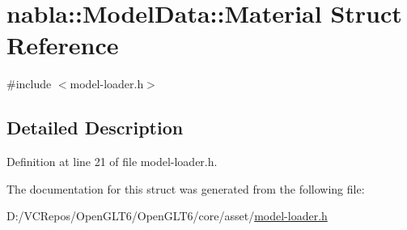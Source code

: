 \hypertarget{structnabla_1_1_model_data_1_1_material}{}\section{nabla\+::Model\+Data\+::Material Struct Reference}
\label{structnabla_1_1_model_data_1_1_material}


{\ttfamily \#include $<$model-\/loader.\+h$>$}



\subsection{Detailed Description}


Definition at line 21 of file model-\/loader.\+h.



The documentation for this struct was generated from the following file\+:\begin{DoxyCompactItemize}
\item 
D\+:/\+V\+C\+Repos/\+Open\+G\+L\+T6/\+Open\+G\+L\+T6/core/asset/\mbox{\hyperlink{model-loader_8h}{model-\/loader.\+h}}\end{DoxyCompactItemize}
